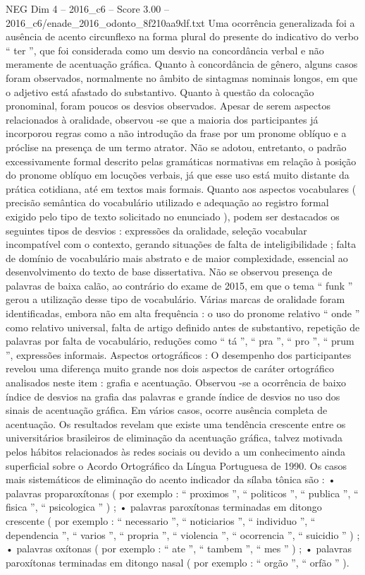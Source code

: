 \begin{textsample}{NEG Dim 4 – 2016\_c6 – Score 3.00 – 2016\_c6/enade\_2016\_odonto\_8f210aa9df.txt}
Uma ocorrência generalizada foi a ausência de acento circunflexo na forma plural do presente do indicativo do verbo “ ter ”, que foi considerada como um desvio na concordância verbal e não meramente de acentuação gráfica.
Quanto à concordância de gênero, alguns casos foram observados, normalmente no âmbito de sintagmas nominais longos, em que o adjetivo está afastado do substantivo.
Quanto à questão da colocação pronominal, foram poucos os desvios observados.
Apesar de serem aspectos relacionados à oralidade, observou -se que a maioria dos participantes já incorporou regras como a não introdução da frase por um pronome oblíquo e a próclise na presença de um termo atrator.
Não se adotou, entretanto, o padrão excessivamente formal descrito pelas gramáticas normativas em relação à posição do pronome oblíquo em locuções verbais, já que esse uso está muito distante da prática cotidiana, até em textos mais formais.
Quanto aos aspectos vocabulares ( precisão semântica do vocabulário utilizado e adequação ao registro formal exigido pelo tipo de texto solicitado no enunciado ), podem ser destacados os seguintes tipos de desvios : expressões da oralidade, seleção vocabular incompatível com o contexto, gerando situações de falta de inteligibilidade ; falta de domínio de vocabulário mais abstrato e de maior complexidade, essencial ao desenvolvimento do texto de base dissertativa.
Não se observou presença de palavras de baixa calão, ao contrário do exame de 2015, em que o tema “ funk ” gerou a utilização desse tipo de vocabulário.
Várias marcas de oralidade foram identificadas, embora não em alta frequência : o uso do pronome relativo “ onde ” como relativo universal, falta de artigo definido antes de substantivo, repetição de palavras por falta de vocabulário, reduções como “ tá ”, “ pra ”, “ pro ”, “ prum ”, expressões informais.
Aspectos ortográficos : O desempenho dos participantes revelou uma diferença muito grande nos dois aspectos de caráter ortográfico analisados neste item : grafia e acentuação.
Observou -se a ocorrência de baixo índice de desvios na grafia das palavras e grande índice de desvios no uso dos sinais de acentuação gráfica.
Em vários casos, ocorre ausência completa de acentuação.
Os resultados revelam que existe uma tendência crescente entre os universitários brasileiros de eliminação da acentuação gráfica, talvez motivada pelos hábitos relacionados às redes sociais ou devido a um conhecimento ainda superficial sobre o Acordo Ortográfico da Língua Portuguesa de 1990.
Os casos mais sistemáticos de eliminação do acento indicador da sílaba tônica são : • palavras proparoxítonas ( por exemplo : “ proximos ”, “ politicos ”, “ publica ”, “ fisica ”, “ psicologica ” ) ; • palavras paroxítonas terminadas em ditongo crescente ( por exemplo : “ necessario ”, “ noticiarios ”, “ individuo ”, “ dependencia ”, “ varios ”, “ propria ”, “ violencia ”, “ ocorrencia ”, “ suicidio ” ) ; • palavras oxítonas ( por exemplo : “ ate ”, “ tambem ”, “ mes ” ) ; • palavras paroxítonas terminadas em ditongo nasal ( por exemplo : “ orgão ”, “ orfão ” ).

\end{textsample}
